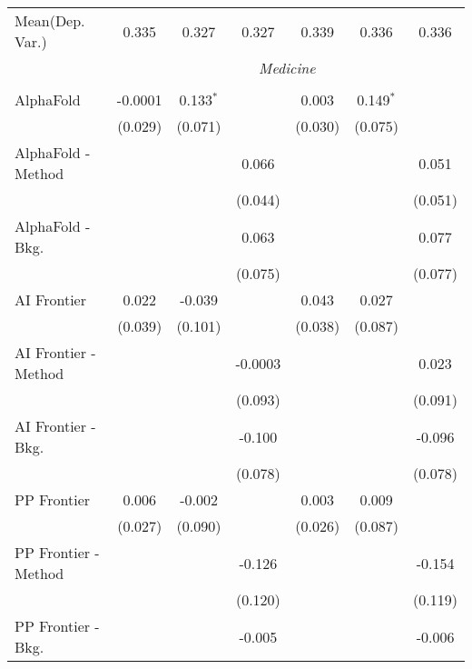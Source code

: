 \begin{tabular}{lcccccc}
Mean(Dep. Var.) & 0.335 & 0.327 & 0.327 & 0.339 & 0.336 & 0.336 \\
 & \multicolumn{6}{c}{\textit{Medicine}} \\ \\
   AlphaFold            & -0.0001 & 0.133$^{*}$   &               & 0.003   & 0.149$^{*}$  &   \\   
                        & (0.029) & (0.071)       &               & (0.030) & (0.075)      &   \\   
   AlphaFold - Method   &         &               & 0.066         &         &              & 0.051\\   
                        &         &               & (0.044)       &         &              & (0.051)\\   
   AlphaFold - Bkg.     &         &               & 0.063         &         &              & 0.077\\   
                        &         &               & (0.075)       &         &              & (0.077)\\   
   AI Frontier          & 0.022   & -0.039        &               & 0.043   & 0.027        &   \\   
                        & (0.039) & (0.101)       &               & (0.038) & (0.087)      &   \\   
   AI Frontier - Method &         &               & -0.0003       &         &              & 0.023\\   
                        &         &               & (0.093)       &         &              & (0.091)\\   
   AI Frontier - Bkg.   &         &               & -0.100        &         &              & -0.096\\   
                        &         &               & (0.078)       &         &              & (0.078)\\   
   PP Frontier          & 0.006   & -0.002        &               & 0.003   & 0.009        &   \\   
                        & (0.027) & (0.090)       &               & (0.026) & (0.087)      &   \\   
   PP Frontier - Method &         &               & -0.126        &         &              & -0.154\\   
                        &         &               & (0.120)       &         &              & (0.119)\\   
   PP Frontier - Bkg.   &         &               & -0.005        &         &              & -0.006\\   

\end{tabular}
